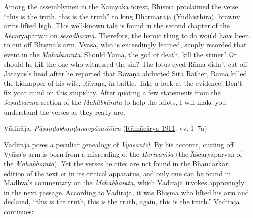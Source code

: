 \begin{pullquote}
Among the assemblymen in the Kāmyaka forest, Bhīṣma proclaimed the verse “this is the truth, this is the truth” to king Dharmarāja (Yudhiṣṭhira), brawny arms lifted high. This well-known tale is found in the second chapter of the Āścaryaparvan on \emph{śeṣadharma}. Therefore, the heroic thing to do would have been to cut off Bhīṣma’s arm. Vyāsa, who is exceedingly learned, simply recorded that event in the \emph{Mahābhārata}. Should Yama, the god of death, kill the sinner? Or should he kill the one who witnessed the sin? The lotus-eyed Rāma didn’t cut off Jaṭāyus’s head after he reported that Rāvaṇa abducted Sītā Rather, Rāma killed the kidnapper of his wife, Rāvaṇa, in battle. Take a look at the evidence! Don’t fix your mind on this stupidity. After quoting a few statements from the \emph{śeṣadharma} section of the \emph{Mahābhārata} to help the idiots, I will make you understand the verses as they really are.


\medskip\hfill\begin{minipage}{0.9\textwidth}\small\hfill
Vādirāja, \emph{{Pāṣaṇḍakhaṇḍanavyāsastōtra}} (\hyperref[VP]{Rāmācārya 1911}, vv. 1–7a)\end{minipage}\hspace{2em}
\end{pullquote}

Vādirāja poses a peculiar genealogy of \emph{Vyāsantōḷ}. By his account, cutting off Vyāsa’s arm is born from a misreading of the \emph{{Harivaṁśa}} (the Āścaryaparvan of the \emph{Mahābhārata}). Yet the verses he cites are not found in the Bhandarkar edition of the text or in its critical apparatus, and only one can be found in Madhva’s commentary on the \emph{Mahābhārata}, which Vādirāja invokes approvingly in the next passage. According to Vādirāja, it was Bhīṣma who lifted his arm and declared, “this is the truth, this is the truth, again, this is the truth.” Vādirāja continues:

